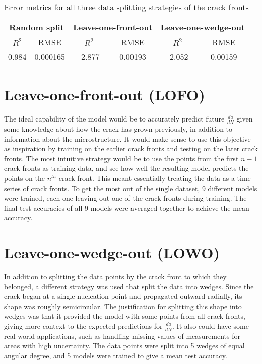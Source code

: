 \begin{table}[t]
  \centering
  \caption{Error metrics for all three data splitting strategies of the crack fronts}
  \label{table:error-metrics}
  \begin{tabular}{| c | c | c | c | c | c |} \hline
  \multicolumn{2}{|c|}{Random split} & \multicolumn{2}{|c|}{Leave-one-front-out} & \multicolumn{2}{|c|}{Leave-one-wedge-out} \\ \hline
  $R^2$ & RMSE & $R^2$ & RMSE & $R^2$ & RMSE \\ \hline
  0.984 & 0.000165 & -2.877 & 0.00193 & -2.052 & 0.00159 \\ \hline
  \end{tabular}
\end{table}

\section{Leave-one-front-out (LOFO)}
The ideal capability of the model would be to accurately predict future $\frac{da}{dN}$ given some knowledge about how the crack has grown previously, in addition to information about the microstructure.  It would make sense to use this objective as inspiration by training on the earlier crack fronts and testing on the later crack fronts.  The most intuitive strategy would be to use the points from the first $n-1$ crack fronts as training data, and see how well the resulting model predicts the points on the $n^{th}$ crack front.  This meant essentially treating the data as a time-series of crack fronts.  To get the most out of the single dataset, 9 different models were trained, each one leaving out one of the crack fronts during training.  The final test accuracies of all 9 models were averaged together to achieve the mean accuracy.

\section{Leave-one-wedge-out (LOWO)}
In addition to splitting the data points by the crack front to which they belonged, a different strategy was used that split the data into wedges.  Since the crack began at a single nucleation point and propagated outward radially, its shape was roughly semicircular.  The justification for splitting this shape into wedges was that it provided the model with some points from all crack fronts, giving more context to the expected predictions for $\frac{da}{dN}$.  It also could have some real-world applications, such as handling missing values of measurements for areas with high uncertainty.  The data points were split into 5 wedges of equal angular degree, and 5 models were trained to give a mean test accuracy.

